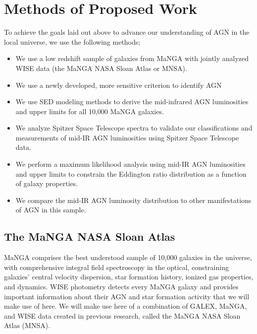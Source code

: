 \documentclass[12pt, preprint]{hacked-aastex}
\begin{document}
\section{Methods of Proposed Work\label{sec:methods}}

To achieve the goals laid out above to advance our understanding 
of AGN in the local universe, we use the following methods;
\begin{itemize}
    \item We use a low redshift sample of galaxies from MaNGA with 
    jointly analyzed WISE data (the MaNGA NASA Sloan Atlas or MNSA).
    \item We use a newly developed, more sensitive criterion to 
    identify AGN 
    \item We use SED modeling methods to derive the mid-infrared AGN 
    luminosities and upper limits for all 10,000 MaNGA galaxies. 
    \item We analyze Spitzer Space Telescope spectra to validate our 
    classifications and measurements of mid-IR 
    AGN luminosities using Spitzer Space Telescope data. 
    \item We perform a maximum likelihood analysis using mid-IR AGN luminosities 
     and upper limits to constrain the Eddington ratio  distribution as a 
     function of galaxy properties.
    \item We compare the mid-IR AGN luminosity distribution to other manifestations 
    of AGN in this sample.
\end{itemize}

\subsection{The MaNGA NASA Sloan Atlas}

MaNGA comprises the best understood sample of 10,000 galaxies in the universe, 
with comprehensive integral field spectroscopy in the  optical, constraining 
galaxies' central velocity dispersion, star formation history, ionized gas properties,
and dynamics. WISE photometry detects every MaNGA galaxy and provides important 
information about their AGN and star formation activity that we will make use of
here. We will make use here of a combination of GALEX, MaNGA, and WISE 
data created in previous research, called the MaNGA NASA Sloan Atlas (MNSA).
\end{document}

